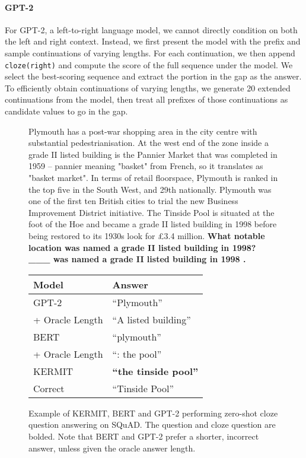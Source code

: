 \documentclass{article}
\begin{document}
\paragraph{GPT-2} For GPT-2, a left-to-right language model, we cannot directly condition on both the left and right context. Instead, we first present the model with the prefix  and sample continuations of varying lengths. For each continuation, we then append \texttt{\small cloze(right)} and compute the score of the full sequence under the model. We select the best-scoring sequence and extract the portion in the gap as the answer. To efficiently obtain continuations of varying lengths, we generate 20 extended continuations from the model, then treat all prefixes of those continuations as candidate values to go in the gap.

\begin{figure}[t]
\begin{minipage}{.5\textwidth}
\scriptsize
\begin{flushleft}
Plymouth has a post-war shopping area in the city centre with substantial pedestrianisation. At the west end of the zone inside a grade II listed building is the Pannier Market that was completed in 1959 – pannier meaning "basket" from French, so it translates as "basket market". In terms of retail floorspace, Plymouth is ranked in the top five in the South West, and 29th nationally. Plymouth was one of the first ten British cities to trial the new Business Improvement District initiative. The Tinside Pool is situated at the foot of the Hoe and became a grade II listed building in 1998 before being restored to its 1930s look for £3.4 million. \textbf{What notable location was named a grade II listed building in 1998? \_\_\_ was named a grade II listed building in 1998 .}
\end{flushleft}
\end{minipage}
\begin{minipage}{.5\textwidth}
\begin{tabular}{ll}
\bfseries Model                     & \bfseries Answer  \\
\midrule
GPT-2                               &  ``Plymouth''          \\
{\color{gray} + Oracle Length} &  ``A listed building'' \\
\midrule
BERT                                &  ``plymouth''          \\
{\color{gray} + Oracle Length} &  ``: the pool''        \\
\midrule
KERMIT                              &  \textbf{``the tinside pool''}  \\
\midrule
Correct                             &  ``Tinside Pool''
\end{tabular}\end{minipage}\vspace{0.5em}
\parbox{\textwidth}{\dotfill}
\caption{Example of KERMIT, BERT and GPT-2 performing zero-shot cloze question answering on SQuAD. The question and cloze question are bolded. Note that BERT and GPT-2 prefer a shorter, incorrect answer, unless given the oracle answer length.}
\label{fig:clozeqa_example}
\end{figure}
\end{document}
